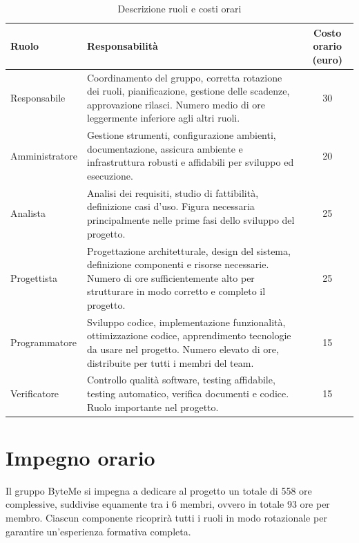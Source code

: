 \documentclass[11pt,a4paper]{article}
\begin{document}
\begin{table}[H]
    \centering
    \begin{tabular}{|p{}|p{}|c|}
        \hline
        \textbf{Ruolo} & \textbf{Responsabilità} & \textbf{Costo orario (euro)} \\
        \hline
        Responsabile & Coordinamento del gruppo, corretta rotazione dei ruoli, pianificazione, gestione delle scadenze, approvazione rilasci. Numero medio di ore leggermente inferiore agli altri ruoli. & 30 \\
        \hline
        Amministratore & Gestione strumenti, configurazione ambienti, documentazione, assicura ambiente e infrastruttura robusti e affidabili per sviluppo ed esecuzione. & 20 \\
        \hline
        Analista & Analisi dei requisiti, studio di fattibilità, definizione casi d'uso. Figura necessaria principalmente nelle prime fasi dello sviluppo del progetto. & 25 \\
        \hline
        Progettista & Progettazione architetturale, design del sistema, definizione componenti e risorse necessarie. Numero di ore sufficientemente alto per strutturare in modo corretto e completo il progetto. & 25 \\
        \hline
        Programmatore & Sviluppo codice, implementazione funzionalità, ottimizzazione codice, apprendimento tecnologie da usare nel progetto. Numero elevato di ore, distribuite per tutti i membri del team. & 15 \\
        \hline
        Verificatore & Controllo qualità software, testing affidabile, testing automatico, verifica documenti e codice. Ruolo importante nel progetto. & 15 \\
        \hline
    \end{tabular}
    \caption{Descrizione ruoli e costi orari}
\end{table}
\newpage

\section{Impegno orario}
Il gruppo ByteMe si impegna a dedicare al progetto un totale di 558 ore complessive, suddivise equamente tra i 6 membri, ovvero in totale 93 ore per membro. Ciascun componente ricoprirà tutti i ruoli in modo rotazionale per garantire un'esperienza formativa completa.
\end{document}
